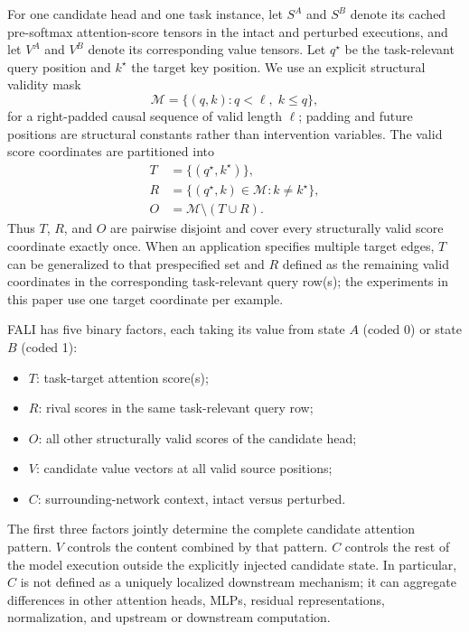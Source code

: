 \documentclass[pdflatex,sn-mathphys-ay]{sn-jnl}
\begin{document}
For one candidate head and one task instance, let $S^{A}$ and $S^{B}$ denote its cached pre-softmax attention-score tensors in the intact and perturbed executions, and let $V^{A}$ and $V^{B}$ denote its corresponding value tensors. Let $q^{\star}$ be the task-relevant query position and $k^{\star}$ the target key position. We use an explicit structural validity mask
\begin{equation}
\mathcal{M}=\{(q,k): q<\ell,\; k\le q\},
\label{eq:valid-mask}
\end{equation}
for a right-padded causal sequence of valid length $\ell$; padding and future positions are structural constants rather than intervention variables. The valid score coordinates are partitioned into
\begin{align}
T &= \{(q^{\star},k^{\star})\}, \\
R &= \{(q^{\star},k)\in\mathcal{M}: k\neq k^{\star}\}, \\
O &= \mathcal{M}\setminus (T\cup R).
\label{eq:tro-partition}
\end{align}
Thus $T$, $R$, and $O$ are pairwise disjoint and cover every structurally valid score coordinate exactly once. When an application specifies multiple target edges, $T$ can be generalized to that prespecified set and $R$ defined as the remaining valid coordinates in the corresponding task-relevant query row(s); the experiments in this paper use one target coordinate per example.

FALI has five binary factors, each taking its value from state $A$ (coded 0) or state $B$ (coded 1):
\begin{itemize}
    \item $T$: task-target attention score(s);
    \item $R$: rival scores in the same task-relevant query row;
    \item $O$: all other structurally valid scores of the candidate head;
    \item $V$: candidate value vectors at all valid source positions;
    \item $C$: surrounding-network context, intact versus perturbed.
\end{itemize}
The first three factors jointly determine the complete candidate attention pattern. $V$ controls the content combined by that pattern. $C$ controls the rest of the model execution outside the explicitly injected candidate state. In particular, $C$ is not defined as a uniquely localized downstream mechanism; it can aggregate differences in other attention heads, MLPs, residual representations, normalization, and upstream or downstream computation.
\end{document}
